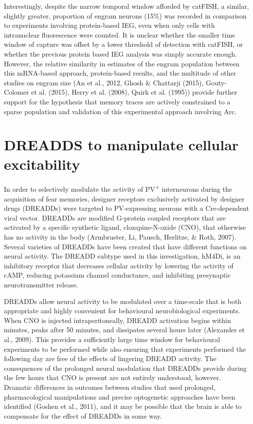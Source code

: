 \documentclass[12pt,a4paper,]{report}
\begin{document}
Interestingly, despite the narrow temporal window afforded by catFISH, a
similar, slightly greater, proportion of engram neurons (15\%) was
recorded in comparison to experiments involving protein-based IEG, even
when only cells with intranuclear fluorescence were counted. It is
unclear whether the smaller time window of capture was offset by a lower
threshold of detection with catFISH, or whether the previous protein
based IEG analysis was simply accurate enough. However, the relative
similarity in estimates of the engram population between this mRNA-based
approach, protein-based results, and the multitude of other studies on
engram size (An et al., 2012, Ghosh \& Chattarji (2015), Gouty-Colomer
et al. (2015), Herry et al. (2008), Quirk et al. (1995)) provide further
support for the hypothesis that memory traces are actively constrained
to a sparse population and validation of this experimental approach
involving Arc.

\section{DREADDS to manipulate cellular
excitability}\label{dreadds-to-manipulate-cellular-excitability}

In order to selectively modulate the activity of PV\textsuperscript{+}
interneurons during the acquisition of fear memories, designer receptors
exclusively activated by designer drugs (DREADDs) were targeted to
PV-expressing neurons with a Cre-dependent viral vector. DREADDs are
modified G-protein coupled receptors that are activated by a specific
synthetic ligand, clozapine-N-oxide (CNO), that otherwise has no
activity in the body (Armbruster, Li, Pausch, Herlitze, \& Roth, 2007).
Several varieties of DREADDs have been created that have different
functions on neural activity. The DREADD subtype used in this
investigation, hM4Di, is an inhibitory receptor that decreases cellular
activity by lowering the activity of cAMP, reducing potassium channel
conductance, and inhibiting presynaptic neurotransmitter release.

DREADDs allow neural activity to be modulated over a time-scale that is
both appropriate and highly convenient for behavioural neurobiological
experiments. When CNO is injected intraperitoneally, DREADD activation
begins within minutes, peaks after 50 minutes, and dissipates several
hours later (Alexander et al., 2009). This provides a sufficiently large
time window for behavioural experiments to be performed while also
ensuring that experiments performed the following day are free of the
effects of lingering DREADD activity. The consequences of the prolonged
neural modulation that DREADDs provide during the few hours that CNO is
present are not entirely understood, however. Dramatic differences in
outcomes between studies that used prolonged, pharmacological
manipulations and precise optogenetic approaches have been identified
(Goshen et al., 2011), and it may be possible that the brain is able to
compensate for the effect of DREADDs in some way.
\end{document}
